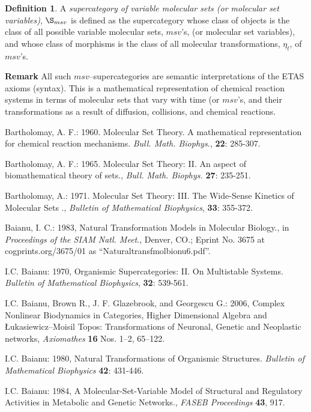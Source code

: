 \documentclass[12pt]{article}
\theoremstyle{plain}
\theoremstyle{definition}
\newtheorem{definition}{Definition}[section]
\numberwithin{equation}{section}
\begin{document}
\begin{definition}
A \emph{supercategory of variable molecular sets (or molecular set variables)}, $\S_{msv}$ is defined 
as the supercategory whose class of objects is the class of all possible variable molecular sets, $msv$'s,  (or molecular set variables), and whose class of morphisms is the class of all molecular transformations, \textbf{$\eta_t$}, of $msv$'s.
\end{definition}

\textbf{Remark}
All such $msv$--supercategories are semantic interpretations of the ETAS axioms (syntax).
This is a mathematical representation of chemical reaction systems in terms of molecular sets that vary with time (or $msv$'s, and their transformations as a result of diffusion, collisions, and chemical reactions. 

\begin{thebibliography}{9}

Bartholomay, A. F.: 1960. Molecular Set Theory. A mathematical representation for chemical reaction mechanisms. \emph{Bull. Math. Biophys.}, \textbf{22}: 285-307.

Bartholomay, A. F.: 1965. Molecular Set Theory: II. An aspect of biomathematical theory of sets., \emph{Bull. Math. Biophys.} \textbf{27}: 235-251.

Bartholomay, A.: 1971. Molecular Set Theory: III. The Wide-Sense Kinetics of Molecular Sets ., \emph{Bulletin of Mathematical Biophysics}, \textbf{33}: 355-372.

Baianu, I. C.: 1983, Natural Transformation Models in Molecular Biology., in \emph{Proceedings of the SIAM Natl. Meet}., Denver, CO.; Eprint No. 3675 at cogprints.org/3675/01 as ``Naturaltransfmolbionu6.pdf''.

I.C. Baianu: 1970, Organismic Supercategories: II. On Multistable Systems. \emph{Bulletin of Mathematical Biophysics}, \textbf{32}: 539-561.

I.C. Baianu, Brown R., J. F. Glazebrook, and Georgescu G.: 2006, Complex Nonlinear Biodynamics in
Categories, Higher Dimensional Algebra and \L{}ukasiewicz--Moisil Topos: Transformations of
Neuronal, Genetic and Neoplastic networks, \emph{Axiomathes} \textbf{16} Nos. 1--2, 65--122.

I.C. Baianu: 1980, Natural Transformations of Organismic Structures. \emph{Bulletin of Mathematical
Biophysics} \textbf{42}: 431-446.

I.C. Baianu: 1984, A Molecular-Set-Variable Model of Structural and Regulatory Activities in Metabolic and Genetic Networks., \emph{FASEB Proceedings} \textbf{43}, 917. 

\end{thebibliography}

\end{document}
